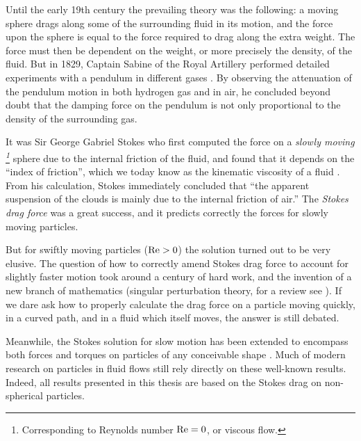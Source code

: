 \documentclass[thesis.tex]{subfiles}
\begin{document}
Until the early 19th century the prevailing theory was the following: a moving sphere drags along some of the surrounding fluid in its motion, and the force upon the sphere is equal to the force required to drag along the extra weight. The force must then be dependent on the weight, or more precisely the density, of the fluid. But in 1829, Captain Sabine of the Royal Artillery performed detailed experiments with a pendulum in different gases \cite{sabine1829}. By observing the attenuation of the pendulum motion in both hydrogen gas and in air, he concluded beyond doubt that the damping force on the pendulum is not only proportional to the density of the surrounding gas.

It was Sir George Gabriel Stokes who first computed the force on a \emph{slowly moving
\footnote{Corresponding to Reynolds number $\mbox{Re}=0$, or viscous flow.}
} sphere due to the internal friction of the fluid, and found that it depends on the ``index of friction'', which we today know as the kinematic viscosity of a fluid \cite{stokes1851}. From his calculation, Stokes immediately concluded that ``the apparent suspension of the clouds is mainly due to the internal friction of air.'' 
The \emph{Stokes drag force} was a great success, and it predicts correctly the forces for slowly moving particles.

But for swiftly moving particles ($\mbox{Re}>0$) the solution turned out to be very elusive. The question of how to correctly amend Stokes drag force to account for slightly faster motion took around a century of hard work, and the invention of a new branch of mathematics (singular perturbation theory, for a review see \cite{goldenfeld2007}). If we dare ask how to properly calculate the drag force on a particle moving quickly, in a curved path, and in a fluid which itself moves, the answer is still debated.

Meanwhile, the Stokes solution for slow motion has been extended to encompass both forces and torques on particles of any conceivable shape \cite{jeffery1922,brenner1974,kim1991}. Much of modern research on particles in fluid flows still rely directly on these well-known results. Indeed, all results presented in this thesis are based on the Stokes drag on non-spherical particles.

\end{document}
